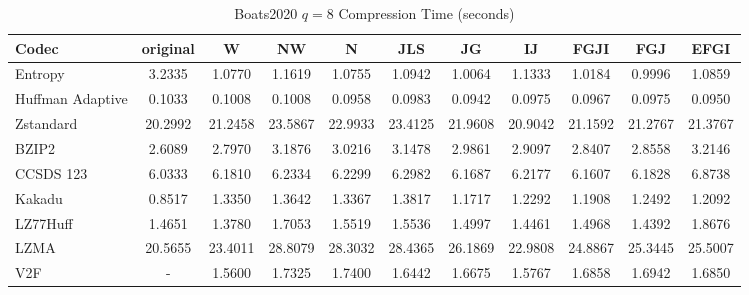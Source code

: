 \documentclass{article}
\begin{document}
\begin{table}[h!]
\centering
\caption{Boats2020 $q=8$ Compression Time (seconds)}
\begin{tabular}{|l|cccccccccc|}
\hline
Codec &  original &       W &      NW &       N &     JLS &      JG &      IJ &    FGJI &     FGJ &    EFGI \\
\hline
Entropy & 3.2335 & 1.0770 & 1.1619 & 1.0755 & 1.0942 & 1.0064 & 1.1333 & 1.0184 & 0.9996 & 1.0859         \\
\hline
Huffman Adaptive &    0.1033 &  0.1008 &  0.1008 &  0.0958 &  0.0983 &  0.0942 &  0.0975 &  0.0967 &  0.0975 &  0.0950 \\
Zstandard        &   20.2992 & 21.2458 & 23.5867 & 22.9933 & 23.4125 & 21.9608 & 20.9042 & 21.1592 & 21.2767 & 21.3767 \\
BZIP2            &    2.6089 &  2.7970 &  3.1876 &  3.0216 &  3.1478 &  2.9861 &  2.9097 &  2.8407 &  2.8558 &  3.2146 \\
CCSDS 123        &    6.0333 &  6.1810 &  6.2334 &  6.2299 &  6.2982 &  6.1687 &  6.2177 &  6.1607 &  6.1828 &  6.8738 \\
Kakadu           &    0.8517 &  1.3350 &  1.3642 &  1.3367 &  1.3817 &  1.1717 &  1.2292 &  1.1908 &  1.2492 &  1.2092 \\
LZ77Huff         &    1.4651 &  1.3780 &  1.7053 &  1.5519 &  1.5536 &  1.4997 &  1.4461 &  1.4968 &  1.4392 &  1.8676 \\
LZMA             &   20.5655 & 23.4011 & 28.8079 & 28.3032 & 28.4365 & 26.1869 & 22.9808 & 24.8867 & 25.3445 & 25.5007 \\
V2F              &    - &  1.5600 &  1.7325 &  1.7400 &  1.6442 &  1.6675 &  1.5767 &  1.6858 &  1.6942 &  1.6850 \\
\hline
\end{tabular}
\end{table}

\newpage
\end{document}
